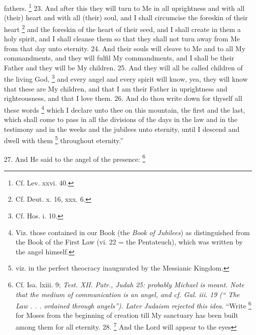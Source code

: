 fathers. \footnote{Cf. Lev. xxvi. 40.} 23. And after this they will turn to Me in all uprightness and with all (their) heart and with all (their) soul, and I shall circumcise the foreskin of their heart \footnote{Cf. Deut. x. 16, xxx. 6.} and the foreskin of the heart of their seed, and I shall create in them a holy spirit, and I shall cleanse them so that they shall not turn away from Me from that day unto eternity. 24. And their souls will cleave to Me and to all My commandments, and they will fulfil My commandments, and I shall be their Father and they will be My children. 25. And they will all be called children of the living God, \footnote{Cf. Hos. i. 10.} and every angel and every spirit will know, yea, they will know that these are My children, and that I am their Father in uprightness and righteousness, and that I love them. 26. And do thou write down for thyself all these words \footnote{Viz. those contained in our Book (the \emph{Book of Jubilees}) as distinguished from the Book of the First Law (vi. 22 = the Pentateuch), which was written by the angel himself.} which I declare unto thee on this mountain, the first and the last, which shall come to pass in all the divisions of the days in the law and in the testimony and in the weeks and the jubilees unto eternity, until I descend and dwell with them \footnote{viz. in the perfect theocracy inaugurated by the Messianic Kingdom.} throughout eternity.''


27. And He said to the angel of the presence: \footnote{Cf. Isa. lxiii. 9; \emph{Test. XII. Patr., Judah 25: probably Michael is meant. Note that the medium of communication is an angel, and cf. Gal. iii. 19 (`` The Law . . . ordained through angels''). Later Judaism rejected this idea.} ``Write \footnote{\emph{i. e.} not the Pentateuch, ``but a history up to the Messianic Kingdom'' (Charles, in Oxford \emph{Corpus}).} for Moses from the beginning of creation till My sanctuary has been built among them for all eternity. 28. \footnote{Read this ver. after ver. 25.} And the Lord will appear to the eyes

}

